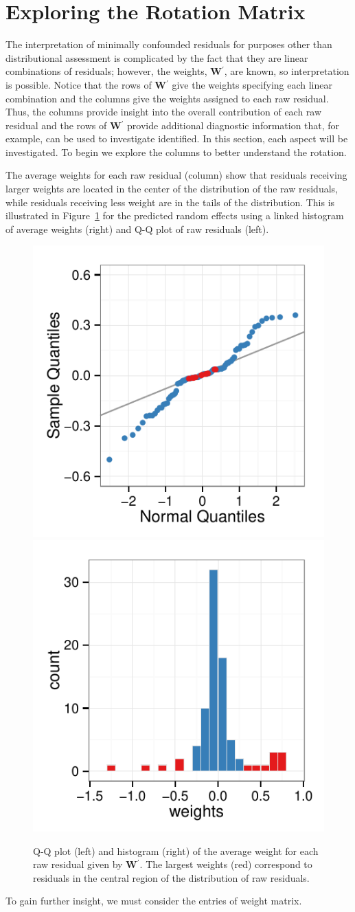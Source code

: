 \documentclass[12pt]{article} %
\newcommand{\trans}{\ensuremath{^\prime}}
\begin{document}
\section{Exploring the Rotation Matrix}

The interpretation of minimally confounded residuals for purposes other than distributional assessment is complicated by the fact that they are linear combinations of residuals; however, the weights, $\bm{W}\trans$, are known, so interpretation is possible. Notice that the rows of $\bm{W}\trans$ give the weights specifying each linear combination and the columns give the weights assigned to each raw residual. Thus, the columns provide insight into the overall contribution of each raw residual and the rows of $\bm{W}\trans$ provide additional diagnostic information that, for example, can be used to investigate identified. In this section, each aspect will be investigated. To begin we explore the columns to better understand the rotation.

The average weights for each raw residual (column) show that residuals receiving larger weights are located in the center of the distribution of the raw residuals, while residuals receiving less weight are in the tails of the distribution. This is illustrated in Figure~\ref{fig:tailwts} for the predicted random effects using a linked histogram of average weights (right) and Q-Q plot of raw residuals (left).
%
\begin{figure}[htbp]
	\centering
	\includegraphics[width=0.4\linewidth]{qq-wts-tail.pdf}
	\includegraphics[width=0.4\linewidth]{hist-wts-tail.pdf}
	\caption{\label{fig:tailwts} Q-Q plot (left) and histogram (right) of the average weight for each raw residual given by $\bm{W}\trans$. The largest weights (red) correspond to residuals in the central region of the distribution of raw residuals.}
\end{figure}
%
To gain further insight, we must consider the entries of weight matrix.
\end{document}
